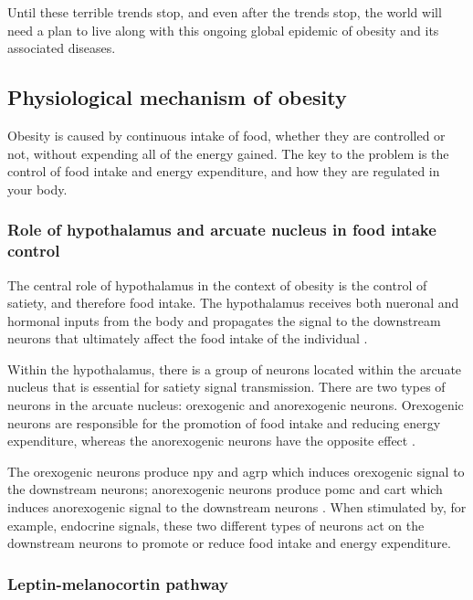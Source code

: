 Until these terrible trends stop, and even after the trends stop, the world will need a plan to live along with this ongoing global epidemic of obesity and its associated diseases.

\subsection{Physiological mechanism of obesity}
\label{sub:physiological_mechanism_of_obesity}

Obesity is caused by continuous intake of food, whether they are controlled or not, without expending all of the energy gained.
The key to the problem is the control of food intake and energy expenditure, and how they are regulated in your body.

\subsubsection{Role of hypothalamus and arcuate nucleus in food intake control}
\label{ssub:role_of_hypothalamus_and_arcuate_nucleus_in_food_intake_control}

The central role of hypothalamus in the context of obesity is the control of satiety, and therefore food intake.
The hypothalamus receives both nueronal and hormonal inputs from the body and propagates the signal to the downstream neurons that ultimately affect the food intake of the individual \citep{Bell2005, Spiegelman2001}.

Within the hypothalamus, there is a group of neurons located within the arcuate nucleus that is essential for satiety signal transmission.
There are two types of neurons in the arcuate nucleus: orexogenic and anorexogenic neurons.
Orexogenic neurons are responsible for the promotion of food intake and reducing energy expenditure, whereas the anorexogenic neurons have the opposite effect \citep{Barsh2002}.

The orexogenic neurons produce \gls{npy} and \gls{agrp} which induces orexogenic signal to the downstream neurons; anorexogenic neurons produce \gls{pomc} and \gls{cart} which induces anorexogenic signal to the downstream neurons \citep{Barsh2002, Spiegelman2001}.
When stimulated by, for example, endocrine signals, these two different types of neurons act on the downstream neurons to promote or reduce food intake and energy expenditure.

\subsubsection{Leptin-melanocortin pathway}
\label{ssub:leptin_melanocortin_pathway}

